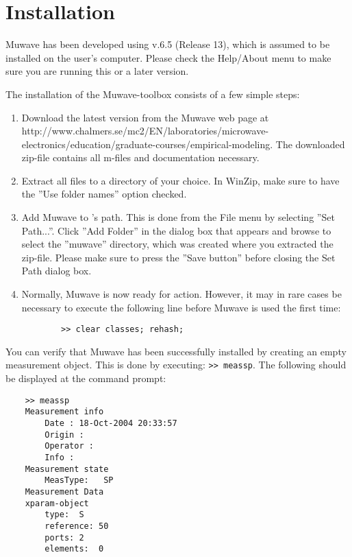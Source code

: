 %
\section{Installation}%
Muwave has been developed using \matlab v.6.5 (Release 13), which
is assumed to be installed on the user's computer. Please check
the Help/About menu to make sure you are running this or a later
version.

The installation of the Muwave-toolbox consists of a few simple
steps:
\begin{enumerate}
    \item Download the latest version from the Muwave web page at \newline http://www.chalmers.se/mc2/EN/laboratories/microwave-electronics/education/graduate-courses/empirical-modeling.
    \newline The downloaded zip-file contains all \matlab m-files and
documentation necessary.
    \item Extract all files to a directory of your choice. In WinZip, make
    sure to have the ''Use folder names'' option checked.
    \item Add Muwave to \matlab's path. This is done from the
    File menu by selecting ''Set Path...''. Click ''Add Folder''
    in the dialog box that appears and browse to select the ''muwave''
    directory, which was created where you extracted the
    zip-file. Please make sure to press the ''Save button''
    before closing the Set Path dialog box.
    \item Normally, Muwave is now ready for action. However, it
    may in rare cases be necessary to execute the following line before
    Muwave is used the first time:
    \begin{verbatim}
        >> clear classes; rehash;
    \end{verbatim}
\end{enumerate}
You can verify that Muwave has been successfully installed by
creating an empty measurement object. This is done by executing:
\verb">> meassp". The following should be displayed at the command
prompt:
\begin{verbatim}
    >> meassp
    Measurement info
        Date : 18-Oct-2004 20:33:57
        Origin :
        Operator :
        Info :
    Measurement state
        MeasType:   SP
    Measurement Data
    xparam-object
        type:  S
        reference: 50
        ports: 2
        elements:  0
\end{verbatim}
